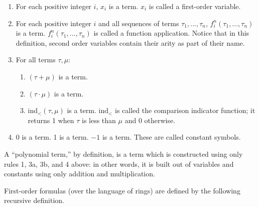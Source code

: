 \documentclass[11pt]{article}
\begin{document}
\begin{enumerate}
	\item For each positive integer $i$, $x_i$ is a term. $x_i$ is called a first-order variable.
	\item For each positive integer $i$ and all sequences of terms $\tau_1, ..., \tau_n$, $f^n_i(\tau_1, ..., \tau_n)$ is a term.
		$f^n_i(\tau_1, ..., \tau_n)$ is called a function application. Notice that in this
		definition, second order variables contain their arity as part of their name.
	\item For all terms $\tau, \mu$:
		\begin{enumerate}
			\item $(\tau + \mu)$ is a term.
			\item $(\tau \cdot \mu)$ is a term.
			\item $\text{ind}_<(\tau, \mu)$ is a term. $\text{ind}_<$ is called the
				comparison indicator function; it returns 1 when $\tau$ is less
				than $\mu$ and 0 otherwise.
		\end{enumerate}
	\item $0$ is a term. 1 is a term. $-1$ is a term. These are called constant symbols.
\end{enumerate}

A ``polynomial term,'' by definition, is a term which is constructed using only rules 1, 3a, 3b, and 4
above: in other words, it is built out of variables and constants using only addition and multiplication.

First-order formulas (over the language of rings) are defined by the following recursive definition.
\end{document}
